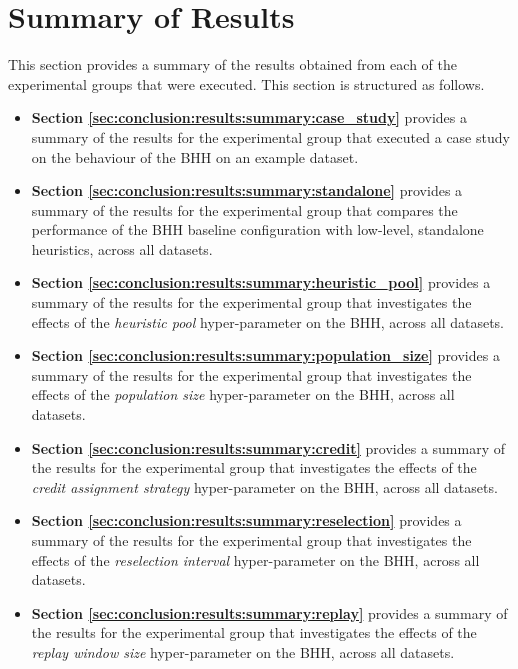 \section{Summary of Results}
\label{sec:conclusion:results}

This section provides a summary of the results obtained from each of the experimental groups that were executed. This section is structured as follows.

\begin{itemize}
      \item \textbf{Section \ref{sec:conclusion:results:summary:case_study}} provides a summary of the results for the experimental group that executed a case study on the behaviour of the \acs{BHH} on an example dataset.

      \item \textbf{Section \ref{sec:conclusion:results:summary:standalone}} provides a summary of the results for the experimental group that compares the performance of the \acs{BHH} baseline configuration with low-level, standalone heuristics, across all datasets.

      \item \textbf{Section \ref{sec:conclusion:results:summary:heuristic_pool}} provides a summary of the results for the experimental group that investigates the effects of the \textit{heuristic pool} hyper-parameter on the \acs{BHH}, across all datasets.

      \item \textbf{Section \ref{sec:conclusion:results:summary:population_size}} provides a summary of the results for the experimental group that investigates the effects of the \textit{population size} hyper-parameter on the \acs{BHH}, across all datasets.

      \item \textbf{Section \ref{sec:conclusion:results:summary:credit}} provides a summary of the results for the experimental group that investigates the effects of the \textit{credit assignment strategy} hyper-parameter on the \acs{BHH}, across all datasets.

      \item \textbf{Section \ref{sec:conclusion:results:summary:reselection}} provides a summary of the results for the experimental group that investigates the effects of the \textit{reselection interval} hyper-parameter on the \acs{BHH}, across all datasets.

      \item \textbf{Section \ref{sec:conclusion:results:summary:replay}} provides a summary of the results for the experimental group that investigates the effects of the \textit{replay window size} hyper-parameter on the \acs{BHH}, across all datasets.


\end{itemize}
